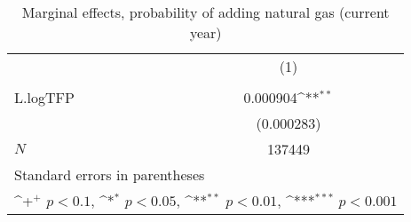 \begin{table}[htbp]\centering
\def\sym#1{\ifmmode^{#1}\else\(^{#1}\)\fi}
\caption{Marginal effects, probability of adding natural gas (current year)}
\begin{tabular}{l*{1}{c}}
\hline\hline
            &\multicolumn{1}{c}{(1)}\\
            &\multicolumn{1}{c}{} \\
\hline
L.logTFP    &    0.000904\sym{**} \\
            &  (0.000283)         \\
\hline
\(N\)       &      137449         \\
\hline\hline
\multicolumn{2}{l}{\footnotesize Standard errors in parentheses}\\
\multicolumn{2}{l}{\footnotesize \sym{+} \(p<0.1\), \sym{*} \(p<0.05\), \sym{**} \(p<0.01\), \sym{***} \(p<0.001\)}\\
\end{tabular}
\end{table}
